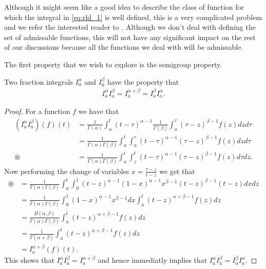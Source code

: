 Although it might seem like a good idea to describe the class of function for which the integral in \eqref{eq:rld_1} is well defined, this is a very complicated problem and we refer the interested reader to \cite{Samko1993}. Although we don't deal with defining the set of admissable functions, this will not have any significant impact on the rest of our discussions because all the functions we deal with will be admissable. 

The first property that we wish to explore is the semigroup property.
\begin{lemma}
    Two fraction integrals $ I_0^\alpha $ and $ I_0^\beta $ have the property that
    \begin{align}
        I_a^\alpha I_a^\beta = I_a^{\alpha + \beta} = I_a^\beta I_a^\alpha.
    \end{align}
\end{lemma} 
\begin{proof}
    For a function $ f $ we have that
    \begin{align}
        (I_a^\alpha I_a^\beta)(f)(t) &= \frac{1}{\Gamma(\alpha)}\int_a^t (t-\tau)^{\alpha - 1}  \frac{1}{\Gamma(\beta)}\int_a^\tau (\tau - z)^{\beta - 1}f(z) dz d\tau \\
            &=\frac{1}{\Gamma(\alpha)\Gamma(\beta)} \int_a^t \int_a^\tau  (t-\tau)^{\alpha - 1}(\tau - z)^{\beta - 1}f(z) dz d\tau \\
            \circledast  &= \frac{1}{\Gamma(\alpha)\Gamma(\beta)} \int_a^t \int_z^t (t-\tau)^{\alpha - 1} (\tau - z)^{\beta - 1} f(z) d\tau dz.
    \end{align}
    Now performing the change of variables $ x = \frac{\tau - z}{t - z} $ we get that
    \begin{align}
        \circledast
        &= \frac{1}{\Gamma(\alpha)\Gamma(\beta)}\int_a^t \int_0^1 (t-z)^{\alpha - 1} (1-x)^{\alpha-1} x^{\beta - 1} (t-z)^{\beta - 1}(t-z) dx dz \\
        &= \frac{1}{\Gamma(\alpha)\Gamma(\beta)}\int_0^1 (1-x)^{\alpha - 1} x^{\beta - 1} dx \int_a^t (t-z)^{\alpha + \beta - 1} f(z) dz \\
        &= \frac{B(\alpha,\beta)}{\Gamma(\alpha)\Gamma(\beta)} \int_a^t (t-z)^{\alpha + \beta - 1} f(z) dz \\
        &= \frac{1}{\Gamma(\alpha + \beta)} \int_a^t (t-z)^{\alpha + \beta - 1} f(z) dz \\
        &= I_a^{\alpha + \beta}(f)(t).
    \end{align}
    This shows that $ I_a^\alpha I_a^\beta = I_a^{\alpha + \beta} $ and hence immediatly implies that $ I_a^\alpha I_a^\beta = I_a^\beta I_a^\alpha $.
\end{proof}
